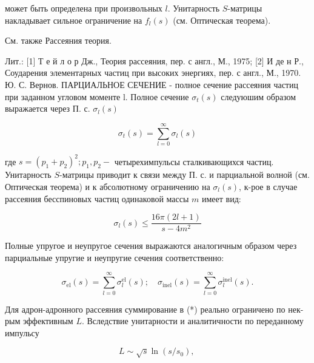 \documentclass[10pt]{article}
\begin{document}
может быть определена при произвольных $l$. Унитарность $S$-матрицы накладывает сильное ограничение на $f_{l}(s)$ (см. Оптическая теорема).



См. также Рассеяния теория.



Лит.: [1] Т е й л о р Дж., Теория рассеяния, пер. с англ., М., 1975; [2] И де н Р., Соударения элементарных частиц при высоких энергиях, пер. с англ., М., 1970. Ю. С. Вернов. ПАРЦИАЛЬНОЕ СЕЧЕНИЕ - полное сечение рассеяния частиц при заданном угловом моменте l. Полное сечение $\sigma_{t}(s)$ следуюшим образом выражается через П. с. $\sigma_{l}(s)$



\[

\sigma_{t}(s)=\sum_{l=0}^{\infty} \sigma_{l}(s)

\]



где $s=\left(p_{1}+p_{2}\right)^{2} ; p_{1}, p_{2}-$ четырехимпульсы сталкивающихся частиц. Унитарность $S$-матрицы приводит к связи между П. с. и парциальной волной (см. Оптическая теорема) и к абсолютному ограничению на $\sigma_{l}(s)$, к-рое в случае рассеяния бесспиновых частиц одинаковой массы $m$ имеет вид:



\[

\sigma_{l}(s) \leqslant \frac{16 \pi(2 l+1)}{s-4 m^{2}}

\]



Полные упругое и неупругое сечения выражаются аналогичным образом через парциальные упругие и неупругие сечения соответственно:



\[

\sigma_{\mathrm{el}}(s)=\sum_{l=0}^{\infty} \sigma_{l}^{\mathrm{el}}(s) ; \quad \sigma_{\mathrm{inel}}(s)=\sum_{l=0}^{\infty} \sigma_{l}^{\mathrm{inel}}(s) .

\]



Для адрон-адронного рассеяния суммирование в (*) реально ограничено по нек-рым эффективным $L$. Вследствие унитарности и аналитичности по переданному импульсу



\[

L \sim \sqrt{s} \ln \left(s / s_{0}\right) \text {, }

\]
\end{document}

